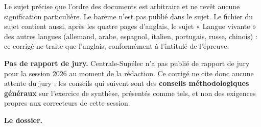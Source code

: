 \documentclass[11pt,a4paper]{article}
\begin{document}
Le sujet précise que l'ordre des documents est arbitraire et ne revêt aucune signification particulière. Le barème n'est pas publié dans le sujet. Le fichier du sujet contient aussi, après les quatre pages d'anglais, le sujet « Langue vivante » des autres langues (allemand, arabe, espagnol, italien, portugais, russe, chinois) : ce corrigé ne traite que l'anglais, conformément à l'intitulé de l'épreuve.

\textbf{Pas de rapport de jury.} Centrale-Supélec n'a pas publié de rapport de jury pour la session 2026 au moment de la rédaction. Ce corrigé ne cite donc aucune attente du jury : les conseils qui suivent sont des \textbf{conseils méthodologiques généraux} sur l'exercice de synthèse, présentés comme tels, et non des exigences propres aux correcteurs de cette session.

\textbf{Le dossier.}
\end{document}
